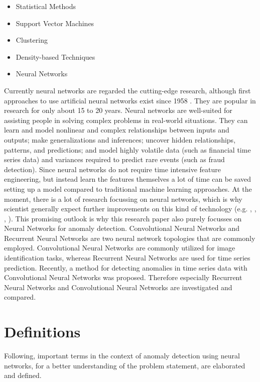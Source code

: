 \begin{itemize}
	\item Statistical Methods
	\item Support Vector Machines
	\item Clustering 
	\item Density-based Techniques
	\item Neural Networks 
\end{itemize}

Currently neural networks are regarded the cutting-edge research, although first approaches to use artificial neural networks exist since 1958 \parencite{Rosenblatt1958}. They are popular in research for only about 15 to 20 years. Neural networks are well-suited for assisting people in solving complex problems in real-world situations. They can learn and model nonlinear and complex relationships between inputs and outputs; make generalizations and inferences; uncover hidden relationships, patterns, and predictions; and model highly volatile data (such as financial time series data) and variances required to predict rare events (such as fraud detection). Since neural networks do not require time intensive feature engineering, but instead learn the features themselves a lot of time can be saved setting up a model compared to traditional machine learning approaches. At the moment, there is a lot of research focussing on neural networks, which is why scientist generally expect further improvements on this kind of technology (e.g. \parencite{Braei2020}, \parencite{Thabtah2020}, \parencite{Verner2019}, \parencite{Wen2019}). This promising outlook is why this research paper also purely focusses on Neural Networks for anomaly detection. Convolutional Neural Networks and Recurrent Neural Networks are two neural network topologies that are commonly employed. Convolutional Neural Networks are commonly utilized for image identification tasks, whereas Recurrent Neural Networks are used for time series prediction. Recently, a method for detecting anomalies in time series data with Convolutional Neural Networks was proposed. Therefore especially Recurrent Neural Networks and Convolutional Neural Networks are investigated and compared.


\section{Definitions}
Following, important terms in the context of anomaly detection using neural networks, for a better understanding of the problem statement, are elaborated and defined. 


